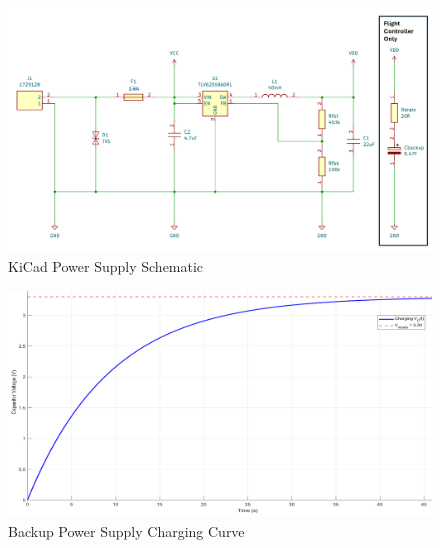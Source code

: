 \begin{figure}[htbp]
  \centering
  \includegraphics[width=\textwidth]{figs/Thomas/Custom Hardware/Power Supply.png}
  \caption{KiCad Power Supply Schematic}
  \label{fig:power_supply_schematic}
\end{figure}

\begin{figure}[htbp]
  \centering
  \includegraphics[width=\textwidth]{figs/Thomas/Custom Hardware/charging_curve.png}
  \caption{Backup Power Supply Charging Curve}
  \label{fig:charging_curve}
\end{figure}

